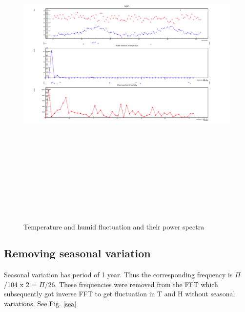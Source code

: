 \begin{figure}[!htbp]
\begin{center}
\includegraphics[height=17cm, width=17cm]{1_b.png}
\caption{Temperature and humid fluctuation and their power spectra}
\label{polar}
\end{center}
\end{figure}


\FloatBarrier
\subsection{Removing seasonal variation}
\paragraph{}
Seasonal variation has period of 1 year. Thus the corresponding frequency is  $\Pi$/104 x 2 =  $\Pi$/26. These frequencies were removed from the FFT which subsequently got inverse FFT to get fluctuation in T and H without seasonal variations. See Fig. \ref{sea}

